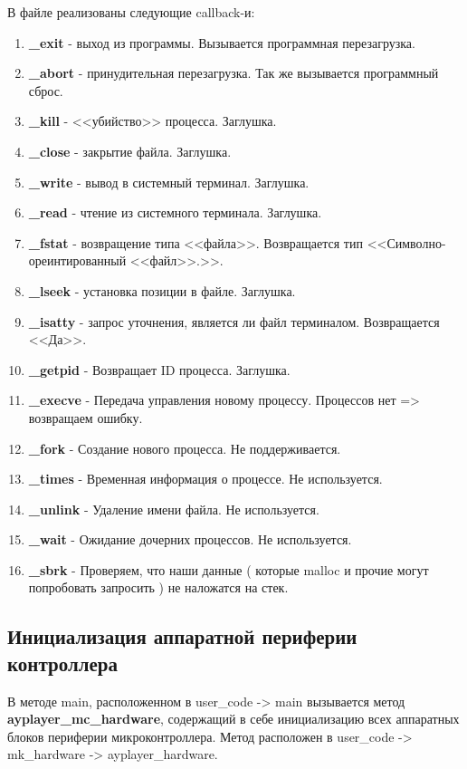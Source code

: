 \documentclass[a4paper, 12pt]{article}
\begin{document}
В файле реализованы следующие callback-и:
\begin{enumerate}
	\item \textbf{\_exit} - выход из программы. Вызывается программная перезагрузка.
	\item \textbf{\_abort} - принудительная перезагрузка. Так же вызывается программный сброс.
	\item \textbf{\_kill} - <<убийство>> процесса. Заглушка.
	\item \textbf{\_close} - закрытие файла. Заглушка.
	\item \textbf{\_write} - вывод в системный терминал. Заглушка.
	\item \textbf{\_read} - чтение из системного терминала. Заглушка.
	\item \textbf{\_fstat} - возвращение типа <<файла>>. Возвращается тип <<Символно-ореинтированный <<файл>>.>>.
	\item \textbf{\_lseek} - установка позиции в файле. Заглушка.
	\item \textbf{\_isatty} - запрос уточнения, является ли файл терминалом. Возвращается <<Да>>.
	\item \textbf{\_getpid} - Возвращает ID процесса. Заглушка.
	\item \textbf{\_execve} - Передача управления новому процессу. Процессов нет => возвращаем ошибку.
	\item \textbf{\_fork} - Создание нового процесса. Не поддерживается.
	\item \textbf{\_times} - Временная информация о процессе. Не используется.
	\item \textbf{\_unlink} - Удаление имени файла. Не используется.
	\item \textbf{\_wait} - Ожидание дочерних процессов. Не используется.
	\item \textbf{\_sbrk} - Проверяем, что наши данные ( которые malloc и прочие могут попробовать запросить ) не наложатся на стек.
\end{enumerate}

\subsection{Инициализация аппаратной периферии контроллера}
В методе main, расположенном в user\_\-code -> main вызывается метод \textbf{ayplayer\_\-mc\_\-hardware}, содержащий в себе инициализацию всех аппаратных блоков периферии микроконтроллера. Метод расположен в user\_\-code -> mk\_\-hardware -> ayplayer\_\-hardware.
\end{document}

